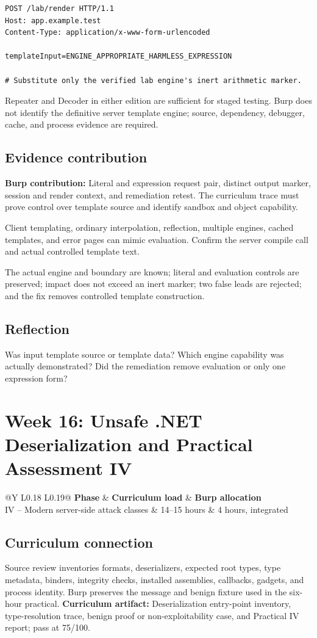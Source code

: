 \documentclass[11pt]{article}
\makeatletter
\newcommand{\weekheader}[5]{%
  \clearpage
  \section{Week #1: #2}
  \begin{tcolorbox}[colback=Navy,colframe=Navy,coltext=white]
    \begin{tabularx}{\linewidth}{@{}Y L{0.18\linewidth} L{0.19\linewidth}@{}}
      \textbf{Phase} & \textbf{Curriculum load} & \textbf{Burp allocation}\\
      #3 & #4 hours & #5 hours, integrated
    \end{tabularx}
  \end{tcolorbox}
}
\newcommand{\weekfield}[2]{%
  \Needspace{5\baselineskip}
  \subsection*{#1}
  #2
}
\newcommand{\curriculumartifact}[1]{\textbf{Curriculum artifact:} #1}
\newcommand{\burpevidence}[1]{\textbf{Burp contribution:} #1}
\makeatother
\begin{document}
\begin{lstlisting}[caption={Engine-specific harmless expression placeholder}]
POST /lab/render HTTP/1.1
Host: app.example.test
Content-Type: application/x-www-form-urlencoded

templateInput=ENGINE_APPROPRIATE_HARMLESS_EXPRESSION

# Substitute only the verified lab engine's inert arithmetic marker.
\end{lstlisting}

\begin{editionbox}
Repeater and Decoder in either edition are sufficient for staged testing. Burp
does not identify the definitive server template engine; source, dependency,
debugger, cache, and process evidence are required.
\end{editionbox}

\weekfield{Evidence contribution}{\burpevidence{Literal and expression request
pair, distinct output marker, session and render context, and remediation retest.}
The curriculum trace must prove control over template source and identify sandbox
and object capability.}

\begin{troubleshootingbox}
Client templating, ordinary interpolation, reflection, multiple engines, cached
templates, and error pages can mimic evaluation. Confirm the server compile call
and actual controlled template text.
\end{troubleshootingbox}

\begin{checkpoints}
The actual engine and boundary are known; literal and evaluation controls are
preserved; impact does not exceed an inert marker; two false leads are rejected;
and the fix removes controlled template construction.
\end{checkpoints}

\weekfield{Reflection}{Was input template source or template data? Which engine
capability was actually demonstrated? Did the remediation remove evaluation or
only one expression form?}

\weekheader{16}{Unsafe .NET Deserialization and Practical Assessment IV}{IV -- Modern server-side attack classes}{14--15}{4}

\weekfield{Curriculum connection}{Source review inventories formats,
deserializers, expected root types, type metadata, binders, integrity checks,
installed assemblies, callbacks, gadgets, and process identity. Burp preserves
the message and benign fixture used in the six-hour practical. \curriculumartifact{Deserialization
entry-point inventory, type-resolution trace, benign proof or non-exploitability
case, and Practical IV report; pass at 75/100.}}
\end{document}
